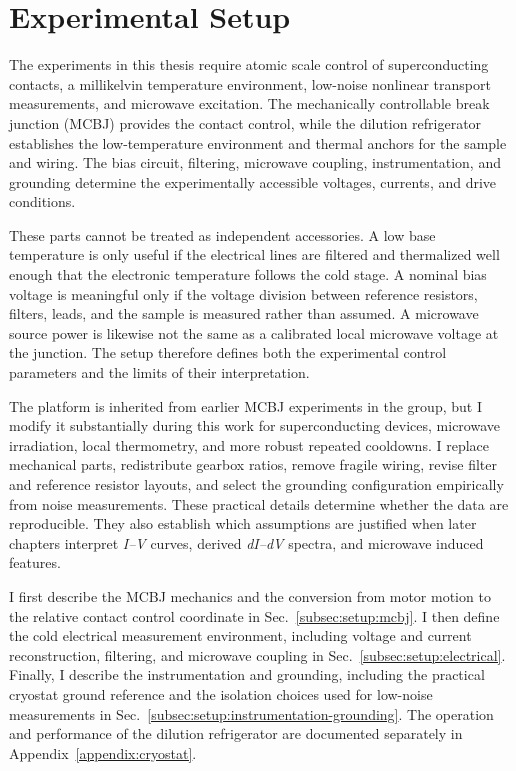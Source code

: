 \section{Experimental Setup}
\label{sec:methods:setup}

    The experiments in this thesis require atomic scale control of superconducting contacts, a millikelvin temperature environment, low-noise nonlinear transport measurements, and microwave excitation. The mechanically controllable break junction (MCBJ) provides the contact control, while the dilution refrigerator establishes the low-temperature environment and thermal anchors for the sample and wiring. The bias circuit, filtering, microwave coupling, instrumentation, and grounding determine the experimentally accessible voltages, currents, and drive conditions.

    These parts cannot be treated as independent accessories. A low base temperature is only useful if the electrical lines are filtered and thermalized well enough that the electronic temperature follows the cold stage. A nominal bias voltage is meaningful only if the voltage division between reference resistors, filters, leads, and the sample is measured rather than assumed. A microwave source power is likewise not the same as a calibrated local microwave voltage at the junction. The setup therefore defines both the experimental control parameters and the limits of their interpretation.

    The platform is inherited from earlier MCBJ experiments in the group, but I modify it substantially during this work for superconducting devices, microwave irradiation, local thermometry, and more robust repeated cooldowns. I replace mechanical parts, redistribute gearbox ratios, remove fragile wiring, revise filter and reference resistor layouts, and select the grounding configuration empirically from noise measurements. These practical details determine whether the data are reproducible. They also establish which assumptions are justified when later chapters interpret \textit{I--V} curves, derived \textit{dI--dV} spectra, and microwave induced features.

    I first describe the MCBJ mechanics and the conversion from motor motion to the relative contact control coordinate in Sec.~\ref{subsec:setup:mcbj}. I then define the cold electrical measurement environment, including voltage and current reconstruction, filtering, and microwave coupling in Sec.~\ref{subsec:setup:electrical}. Finally, I describe the instrumentation and grounding, including the practical cryostat ground reference and the isolation choices used for low-noise measurements in Sec.~\ref{subsec:setup:instrumentation-grounding}. The operation and performance of the dilution refrigerator are documented separately in Appendix~\ref{appendix:cryostat}.

